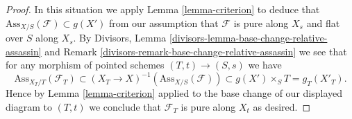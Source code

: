\documentclass[10pt,a4paper]{amsart}
\theoremstyle{plain}
\theoremstyle{definition}
\theoremstyle{remark}
\numberwithin{equation}{subsection}
\begin{document}
\begin{proof}
\medskip\noindent
In this situation we apply
Lemma \ref{lemma-criterion}
to deduce that $\text{Ass}_{X/S}(\mathcal{F}) \subset g(X')$
from our assumption that $\mathcal{F}$ is pure along $X_s$
and flat over $S$ along $X_s$. By
Divisors, Lemma \ref{divisors-lemma-base-change-relative-assassin} and
Remark \ref{divisors-remark-base-change-relative-assassin}
we see that for any morphism of pointed schemes
$(T, t) \to (S, s)$ we have
$$
\text{Ass}_{X_T/T}(\mathcal{F}_T) \subset
(X_T \to X)^{-1}(\text{Ass}_{X/S}(\mathcal{F})) \subset
g(X') \times_S T = g_T(X'_T).
$$
Hence by
Lemma \ref{lemma-criterion}
applied to the base change of our displayed diagram to $(T, t)$
we conclude that $\mathcal{F}_T$ is pure along $X_t$ as desired.
\end{proof}
\end{document}
